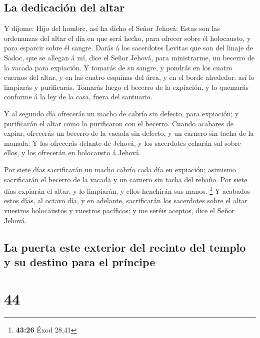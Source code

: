 \hypertarget{la-dedicaciuxf3n-del-altar}{%
\subsection{La dedicación del altar}\label{la-dedicaciuxf3n-del-altar}}

 Y díjome: Hijo del hombre, así ha dicho el Señor Jehová:
Estas son las ordenanzas del altar el día en que será hecho, para
ofrecer sobre él holocausto, y para esparcir sobre él sangre.
 Darás á los sacerdotes Levitas que son del linaje de
Sadoc, que se allegan á mí, dice el Señor Jehová, para ministrarme, un
becerro de la vacada para expiación.  Y tomarás de su
sangre, y pondrás en los cuatro cuernos del altar, y en las cuatro
esquinas del área, y en el borde alrededor: así lo limpiarás y
purificarás.  Tomarás luego el becerro de la expiación, y
lo quemarás conforme á la ley de la casa, fuera del santuario.

 Y al segundo día ofrecerás un macho de cabrío sin defecto,
para expiación; y purificarán el altar como lo purificaron con el
becerro.  Cuando acabares de expiar, ofrecerás un becerro
de la vacada sin defecto, y un carnero sin tacha de la manada:
 Y los ofrecerás delante de Jehová, y los sacerdotes
echarán sal sobre ellos, y los ofrecerán en holocausto á Jehová.

 Por siete días sacrificarán un macho cabrío cada día en
expiación; asimismo sacrificarán el becerro de la vacada y un carnero
sin tacha del rebaño.  Por siete días expiarán el altar, y
lo limpiarán, y ellos henchirán sus manos. \footnote{\textbf{43:26} Éxod
  28,41}  Y acabados estos días, al octavo día, y en
adelante, sacrificarán los sacerdotes sobre el altar vuestros
holocaustos y vuestros pacíficos; y me seréis aceptos, dice el Señor
Jehová.

\hypertarget{la-puerta-este-exterior-del-recinto-del-templo-y-su-destino-para-el-pruxedncipe}{%
\subsection{La puerta este exterior del recinto del templo y su destino
para el
príncipe}\label{la-puerta-este-exterior-del-recinto-del-templo-y-su-destino-para-el-pruxedncipe}}

\hypertarget{section-43}{%
\section{44}\label{section-43}}

